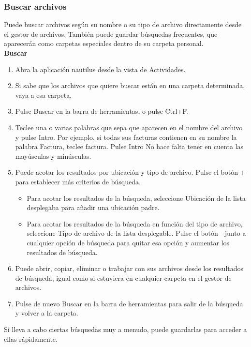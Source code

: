 \subsubsection{Buscar archivos}
Puede buscar archivos según su nombre o su tipo de archivo directamente desde el gestor de archivos. También puede guardar búsquedas frecuentes, que aparecerán como carpetas especiales dentro de su carpeta personal.\\

{\large \bf Buscar}
\begin{enumerate}
\item Abra la aplicación nautilus desde la vista de Actividades.
\item Si sabe que los archivos que quiere buscar están en una carpeta determinada, vaya a esa carpeta.
\item Pulse Buscar en la barra de herramientas, o pulse Ctrl+F.
\item Teclee una o varias palabras que sepa que aparecen en el nombre del archivo y pulse Intro. Por ejemplo, si todas sus facturas contienen en su nombre la palabra Factura, teclee factura. Pulse Intro No hace falta tener en cuenta las mayúsculas y minúsculas.
\item Puede acotar los resultados por ubicación y tipo de archivo. Pulse el botón + para establecer más criterios de búsqueda.
\begin{itemize}
\item Para acotar los resultados de la búsqueda, seleccione Ubicación de la lista desplegaba para añadir una ubicación padre.
\item Para acotar los resultados de la búsqueda en función del tipo de archivo, seleccione Tipo de archivo de la lista desplegable.
Pulse el botón - junto a cualquier opción de búsqueda para quitar esa opción y aumentar los resultados de búsqueda.
\end{itemize}
\item Puede abrir, copiar, eliminar o trabajar con sus archivos desde los resultados de búsqueda, igual como si estuviera en cualquier carpeta en el gestor de archivos.
\item Pulse de nuevo Buscar en la barra de herramientas para salir de la búsqueda y volver a la carpeta.
\end{enumerate}
Si lleva a cabo ciertas búsquedas muy a menudo, puede guardarlas para acceder a ellas rápidamente.\\

